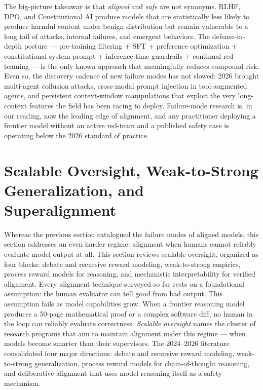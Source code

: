 \documentclass{article}
\begin{document}
The big-picture takeaway is that \emph{aligned} and \emph{safe} are not synonyms. RLHF, DPO, and Constitutional AI produce models that are statistically less likely to produce harmful content under benign distribution but remain vulnerable to a long tail of attacks, internal failures, and emergent behaviors. The defense-in-depth posture --- pre-training filtering + SFT + preference optimization + constitutional system prompt + inference-time guardrails + continual red-teaming --- is the only known approach that meaningfully reduces compound risk. Even so, the discovery cadence of new failure modes has not slowed: 2026 brought multi-agent collusion attacks, cross-modal prompt injection in tool-augmented agents, and persistent context-window manipulations that exploit the very long-context features the field has been racing to deploy. Failure-mode research is, in our reading, now the leading edge of alignment, and any practitioner deploying a frontier model without an active red-team and a published safety case is operating below the 2026 standard of practice.

\section{Scalable Oversight, Weak-to-Strong Generalization, and Superalignment}\label{scalable-oversight-weak-to-strong-generalization-and-superalignment}

Whereas the previous section catalogued the failure modes of aligned models, this section addresses an even harder regime: alignment when humans cannot reliably evaluate model output at all. This section reviews scalable oversight, organized as four blocks: debate and recursive reward modeling, weak-to-strong empirics, process reward models for reasoning, and mechanistic interpretability for verified alignment. Every alignment technique surveyed so far rests on a foundational assumption: the human evaluator can tell good from bad output. This assumption fails as model capabilities grow. When a frontier reasoning model produces a 50-page mathematical proof or a complex software diff, no human in the loop can reliably evaluate correctness. \emph{Scalable oversight} names the cluster of research programs that aim to maintain alignment under this regime --- when models become smarter than their supervisors. The 2024--2026 literature consolidated four major directions: debate and recursive reward modeling, weak-to-strong generalization, process reward models for chain-of-thought reasoning, and deliberative alignment that uses model reasoning itself as a safety mechanism.
\end{document}
